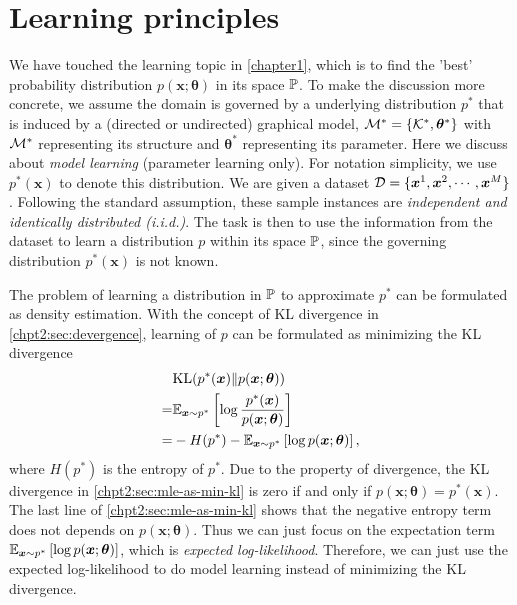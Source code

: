 \section{Learning principles}
We have touched the learning topic in \autoref{chapter1}, which is to find the 'best' probability distribution $p(\bm{x}; \bm{\theta})$ in its space $\mathbb{P}$. To make the discussion more concrete, we assume the domain is governed by a underlying distribution $p^{\ast}$ that is induced by a (directed or undirected) graphical model, $\mathcal{M}^{\ast} = \left\{ \mathcal{K}^{\ast}, \bm{\theta}^{\ast} \right\}$ with $\mathcal{M}^{\ast}$ representing its structure and $\bm{\theta}^{\ast}$ representing its parameter. Here we discuss about \textit{model learning} (parameter learning only). For notation simplicity, we use $p^{\ast}(\bm{x})$ to denote this distribution. We are given a dataset $\mathcal{D} = \{\bm{x}^{1}, \bm{x}^{2}, \cdots, \bm{x}^{M}\}$. Following the standard assumption, these sample instances are \textit{independent and identically distributed (i.i.d.)}. The task is then to use the information from the dataset to learn a distribution $p$ within its space $\mathbb{P}$, since the governing distribution $p^{\ast}(\bm{x})$ is not known.

The problem of learning a distribution in $\mathbb{P}$ to approximate $p^{\ast}$ can be formulated as density estimation. With the concept of KL divergence in \autoref{chpt2:sec:devergence}, learning of $p$ can be formulated as minimizing the KL divergence
\begin{align}\label{chpt2:sec:mle-as-min-kl}
  &\mathrm{KL}(p^{\ast}(\bm{x})\|p(\bm{x}; \bm{\theta})) \nonumber \\
  =& \mathbb{E}_{\bm{x} \sim p^{\ast}}\left[ \log{\frac{p^{\ast}(\bm{x})}{p(\bm{x}; \bm{\theta})}} \right] \nonumber \\
  =& - H(p^{\ast}) - \mathbb{E}_{\bm{x} \sim p^{\ast}}\left[ \log{{p(\bm{x}; \bm{\theta})}} \right],
\end{align}
where $H(p^{\ast})$ is the entropy of $p^{\ast}$.
Due to the property of divergence, the KL divergence in \ref{chpt2:sec:mle-as-min-kl} is zero if and only if $p(\bm{x};\bm{\theta})=p^{\ast}(\bm{x})$. The last line of \ref{chpt2:sec:mle-as-min-kl} shows that the negative entropy term does not depends on $p(\bm{x}; \bm{\theta})$. Thus we can just focus on the expectation term $\mathbb{E}_{\bm{x} \sim p^{\ast}}\left[ \log{{p(\bm{x}; \bm{\theta})}} \right]$, which is \textit{expected log-likelihood}. Therefore, we can just use the expected log-likelihood to do model learning instead of minimizing the KL divergence.

